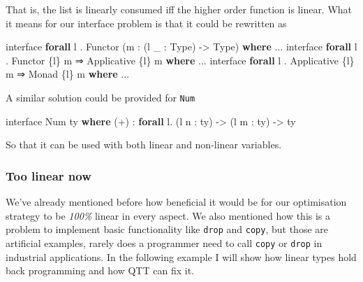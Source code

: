 \documentclass[
]{article}
\newenvironment{Shaded}{}{}
\newcommand{\DataTypeTok}[1]{\textcolor[rgb]{0.56,0.13,0.00}{#1}}
\newcommand{\KeywordTok}[1]{\textcolor[rgb]{0.00,0.44,0.13}{\textbf{#1}}}
\newcommand{\NormalTok}[1]{#1}
\newcommand{\OperatorTok}[1]{\textcolor[rgb]{0.40,0.40,0.40}{#1}}
\newcommand{\OtherTok}[1]{\textcolor[rgb]{0.00,0.44,0.13}{#1}}
\begin{document}
That is, the list is linearly consumed iff the higher order function is
linear. What it means for our interface problem is that it could be
rewritten as

\begin{Shaded}
\begin{Highlighting}[]
\NormalTok{interface }\KeywordTok{forall}\NormalTok{ l }\OperatorTok{.} \DataTypeTok{Functor}\NormalTok{ (m }\OperatorTok{:}\NormalTok{ (l \_ }\OperatorTok{:} \DataTypeTok{Type}\NormalTok{) }\OtherTok{{-}\textgreater{}} \DataTypeTok{Type}\NormalTok{) }\KeywordTok{where}
    \OperatorTok{...}
\NormalTok{interface }\KeywordTok{forall}\NormalTok{ l }\OperatorTok{.} \DataTypeTok{Functor}\NormalTok{ \{l\} m }\OtherTok{⇒} \DataTypeTok{Applicative}\NormalTok{ \{l\} m }\KeywordTok{where}
    \OperatorTok{...}
\NormalTok{interface }\KeywordTok{forall}\NormalTok{ l }\OperatorTok{.} \DataTypeTok{Applicative}\NormalTok{ \{l\} m }\OtherTok{⇒} \DataTypeTok{Monad}\NormalTok{ \{l\} m }\KeywordTok{where}
    \OperatorTok{...}
\end{Highlighting}
\end{Shaded}

A similar solution could be provided for \texttt{Num}

\begin{Shaded}
\begin{Highlighting}[]
\NormalTok{interface }\DataTypeTok{Num}\NormalTok{ ty }\KeywordTok{where}
\NormalTok{    (}\OperatorTok{+}\NormalTok{) }\OperatorTok{:} \KeywordTok{forall}\NormalTok{ l}\OperatorTok{.}\NormalTok{ (l n }\OperatorTok{:}\NormalTok{ ty) }\OtherTok{{-}\textgreater{}}\NormalTok{ (l m }\OperatorTok{:}\NormalTok{ ty) }\OtherTok{{-}\textgreater{}}\NormalTok{ ty}
\end{Highlighting}
\end{Shaded}

So that it can be used with both linear and non-linear variables.

\hypertarget{too-linear-now}{%
\subsubsection{Too linear now}\label{too-linear-now}}

We've already mentioned before how beneficial it would be for our
optimisation strategy to be \emph{100\%} linear in every aspect. We also
mentioned how this is a problem to implement basic functionality like
\texttt{drop} and \texttt{copy}, but those are artificial examples,
rarely does a programmer need to call \texttt{copy} or \texttt{drop} in
industrial applications. In the following example I will show how linear
types hold back programming and how QTT can fix it.
\end{document}
